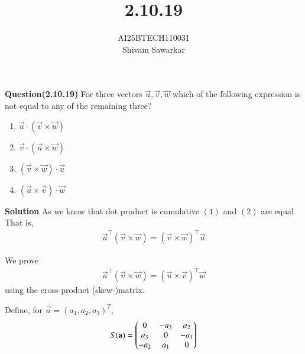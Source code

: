 \documentclass[journal]{IEEEtran}
\begin{document}

\vspace{3cm}

\title{2.10.19}
\author{AI25BTECH110031 \\ Shivam Sawarkar}
 \maketitle
{\let\newpage\relax\maketitle}

\renewcommand{\thefigure}{\theenumi}
\renewcommand{\thetable}{\theenumi}
\setlength{\intextsep}{10pt} %


\renewcommand{\thetable}{\theenumi}

\textbf{Question(2.10.19)}
 For three vectors $\Vec{u},\Vec{v},\vec{w}$ which of the following expression is not equal to any of the
 remaining three?
 \begin{enumerate}[label=\alph*]
     \item $\vec{u}\cdot(\vec{v}\times\vec{w})$
     \item $\vec{v}\cdot(\vec{u}\times\vec{w})$
     \item $(\vec{v}\times\vec{w})\cdot\vec{u}$
     \item $(\vec{u}\times\vec{v})\cdot\vec{w}$
 \end{enumerate}

 \textbf{Solution}
 As we know that dot product is cumulative $(1)$ and $(2)$ are equal \\
 That is,
\begin{align}
     \vec{u}^\top(\vec{v}\times\vec{w}) = (\vec{v}\times\vec{w})^\top\vec{u}
\end{align}

We prove
\begin{align}
\vec{u}^\top(\vec{v}\times\vec{w})=(\vec{u}\times\vec{v})^\top\vec{w}
\end{align}
using the cross-product (skew-)matrix.

Define, for \(\vec{a}=(a_1,a_2,a_3)^T\),
\begin{align}
S(\mathbf{a})=\begin{pmatrix}
0 & -a_3 & a_2\\
a_3 & 0 & -a_1\\
-a_2 & a_1 & 0
\end{pmatrix}
\end{align}
\end{document}
